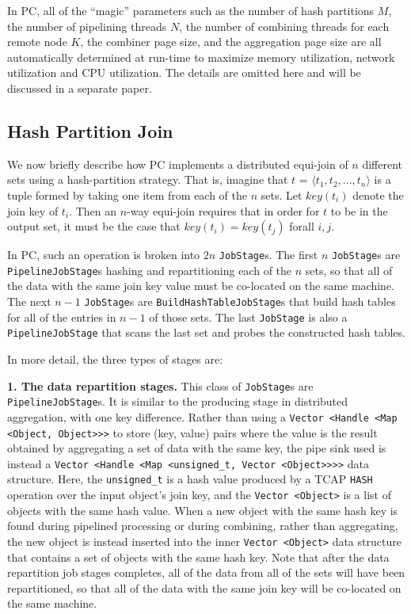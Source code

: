  
In PC, all of the ``magic'' parameters such as the number of hash partitions $M$, 
the number of pipelining threads $N$, 
the number of combining threads for each remote node $K$, 
the combiner page size, and the aggregation page size are all automatically 
determined at run-time to maximize memory utilization, network
utilization and CPU utilization. The details are omitted here and will
be discussed in a separate paper.

\subsection{Hash Partition Join}

We now briefly describe how PC implements a distributed equi-join of $n$ different sets using a hash-partition strategy.  
That is, imagine that $t$ = $\langle t_1, t_2, ..., t_n \rangle$ is a
tuple formed by taking one item from each of the $n$ sets.  Let $key(t_i)$ denote the join key of $t_i$.  Then an $n$-way equi-join requires that
in order for $t$ to be in the output set, it must be the case that
$key(t_i) = key(t_j)$ forall $i, j$. 

In PC, such an operation is broken into $2n$ \texttt{JobStage}s. The first $n$
\texttt{JobStage}s are \texttt{PipelineJobStage}s hashing and repartitioning each of the $n$ sets, so that all of the data with the same join key value
must be co-located on the same machine.  The next $n - 1$ \texttt{JobStage}s
are \texttt{BuildHashTableJobStage}s that build hash tables for all of the
entries in $n - 1$ of those sets.  The last \texttt{JobStage} is also a 
\texttt{PipelineJobStage} that scans the last set and
probes the constructed hash tables.  

In more detail, the three types of stages are:

\vspace{5pt}
{\bf 1. The data repartition stages.} This class of \texttt{JobStage}s are
\texttt{PipelineJobStage}s. It is similar to the producing stage in distributed
aggregation, with one key difference.
Rather than using a \texttt{Vector <Handle <Map <Object, Object}\texttt{>}\texttt{>}\texttt{>} to store (key, value) pairs where the value is the result obtained by aggregating a set of
data with the same key, the pipe sink used is instead a \texttt{Vector <Handle <Map <unsigned\_t, Vector <Object}\texttt{>}\texttt{>}\texttt{>}\texttt{>} data structure.  Here, the
\texttt{unsigned\_t} is a hash value produced by a TCAP \texttt{HASH} operation over the input object's join key, and the \texttt{Vector <Object>} is a list of objects
with the same hash value.  
When a new object with the same hash key is found during pipelined processing or during combining, rather than aggregating, the new object is instead inserted
into the inner \texttt{Vector <Object>} data structure that contains a set of objects with the same hash key.
Note that after the data repartition job stages completes, all of the data from all of the sets will have been repartitioned, so that all of the data with the same join
key will be co-located on the same machine.

